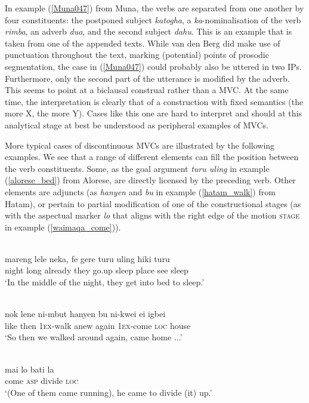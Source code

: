 In example (\ref{Muna047}) from Muna, the verbs are separated from one another by four constituents: the postponed subject \textit{katogha}, a \textit{ka}-nominalisation of the verb \textit{rimba}, an adverb \textit{dua}, and the second subject \textit{dahu}. This is an example that is taken from one of the appended texts. While van den Berg did make use of punctuation throughout the text, marking (potential) points of prosodic segmentation, the case in (\ref{Muna047}) could probably also be uttered in two IPs. Furthermore, only the second part of the utterance is modified by the adverb. This seems to point at a biclausal construal rather than a MVC. At the same time, the interpretation is clearly that of a construction with fixed semantics (the more X, the more Y). Cases like this one are hard to interpret and should at this analytical stage at best be understood as peripheral examples of MVCs.

More typical cases of discontinuous MVCs are illustrated by the following examples. We see that a range of different elements can fill the position between the verb constituents. Some, as the goal argument \textit{turu uling} in example (\ref{alorese_bed}) from Alorese, are directly licensed by the preceding verb. Other elements are adjuncts (as \textit{hanyen} and \textit{bu} in example (\ref{hatam_walk}) from Hatam), or pertain to partial modification of one of the constructional stages (as with the aspectual marker \textit{lo} that aligns with the right edge of the motion \textsc{stage} in example (\ref{waimaqa_come})).

\ea \label{alorese_bed}
\\
\gll mareng lele neka, fe gere turu uling hiki turu \\
night long already they go.up sleep place see sleep \\
\glft `In the middle of the night, they get into bed to sleep.'\\ 
\z

\ea \label{hatam_walk}
\\
\gll nok lene ni-mbut hanyen bu ni-kwei ei igbei \\
like then 1\textsc{ex}-walk anew again 1\textsc{ex}-come \textsc{loc} house \\
\glft `So then we walked around again, came home ...'\\ 
\z

\ea \label{waimaqa_come}
\\
\gll mai lo bati la \\
come \textsc{asp} divide \textsc{loc} \\
\glft `(One of them came running), he came to divide (it) up.'\\ 
\z

